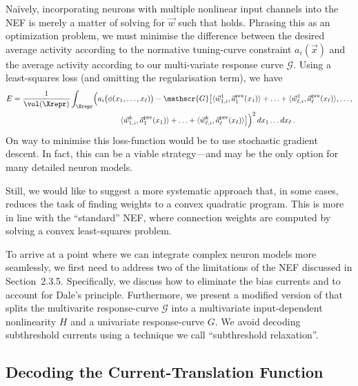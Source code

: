 Na\"ively, incorporating neurons with multiple nonlinear input channels into the NEF is merely a matter of solving for $\vec w$ such that  holds.
Phrasing this as an optimization problem, we must minimise the difference between the desired average activity according to the normative tuning-curve constraint $a_i(\vec x)$ and the average activity according to our multi-variate response curve $\mathscr{G}$.
Using a least-squares loss (and omitting the regularisation term), we have
\begin{align}
	\begin{aligned}
	E &=
	\frac{1}{\vol(\Xrepr)} \int_{\Xrepr} \Bigl( a_i\bigl(\phi(x_1, \ldots, x_\ell)\bigr) -
	\mathscr{G} \bigl[
		\langle \vec w_{1, i}^1, \vec a^\mathrm{pre}_1(x_1) \rangle + \ldots +
		\langle \vec w_{\ell, i}^1, \vec a^\mathrm{pre}_\ell(x_\ell) \rangle, \ldots,\\
	&~\hspace{13.825em}
		\langle \vec w_{1, i}^k, \vec a^\mathrm{pre}_1(x_1) \rangle + \ldots +
		\langle \vec w_{\ell, i}^k, \vec a^\mathrm{pre}_\ell(x_\ell) \rangle
	\bigr] \Bigr)^2 \,dx_1 \ldots dx_\ell \,.
	\end{aligned}
	\label{eqn:dendritic_computation_optimisation}
\end{align}
On way to minimise this loss-function would be to use stochastic gradient descent.
In fact, this can be a viable strategy---and may be the only option for many detailed neuron models.

Still, we would like to suggest a more systematic approach that, in some cases, reduces the task of finding weights to a convex quadratic program.
This is more in line with the \enquote{standard} NEF, where connection weights are computed by solving a convex least-squares problem.

To arrive at a point where we can integrate complex neuron models more seamlessly, we first need to address two of the limitations of the NEF discussed in Section~2.3.5.
Specifically, we discuss how to eliminate the bias currents and to account for Dale's principle.
Furthermore, we present a modified version of  that splits the multivarite response-curve $\mathscr{G}$ into a multivariate input-dependent nonlinearity $H$ and a univariate response-curve $G$.
We avoid decoding subthreshold currents using a technique we call \enquote{subthreshold relaxation}.

\subsection{Decoding the Current-Translation Function}
\label{sec:nef_decode_current}

